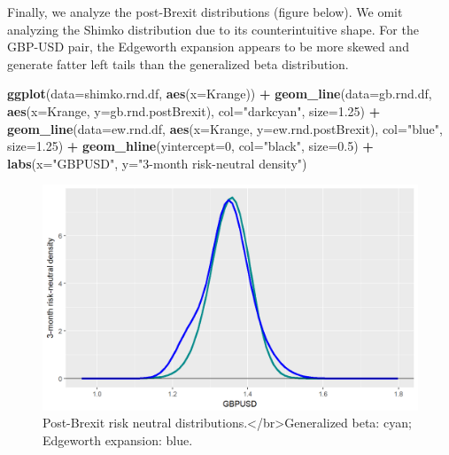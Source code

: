 \documentclass[]{book}
\newenvironment{Shaded}{\begin{snugshade}}{\end{snugshade}}
\newcommand{\KeywordTok}[1]{\textcolor[rgb]{0.13,0.29,0.53}{\textbf{#1}}}
\newcommand{\DataTypeTok}[1]{\textcolor[rgb]{0.13,0.29,0.53}{#1}}
\newcommand{\DecValTok}[1]{\textcolor[rgb]{0.00,0.00,0.81}{#1}}
\newcommand{\FloatTok}[1]{\textcolor[rgb]{0.00,0.00,0.81}{#1}}
\newcommand{\StringTok}[1]{\textcolor[rgb]{0.31,0.60,0.02}{#1}}
\newcommand{\OperatorTok}[1]{\textcolor[rgb]{0.81,0.36,0.00}{\textbf{#1}}}
\newcommand{\NormalTok}[1]{#1}
\theoremstyle{definition}
\theoremstyle{definition}
\theoremstyle{definition}
\theoremstyle{remark}
\begin{document}
Finally, we analyze the post-Brexit distributions (figure below). We
omit analyzing the Shimko distribution due to its counterintuitive
shape. For the GBP-USD pair, the Edgeworth expansion appears to be more
skewed and generate fatter left tails than the generalized beta
distribution.

\begin{Shaded}
\begin{Highlighting}[]
\KeywordTok{ggplot}\NormalTok{(}\DataTypeTok{data=}\NormalTok{shimko.rnd.df, }\KeywordTok{aes}\NormalTok{(}\DataTypeTok{x=}\NormalTok{Krange)) }\OperatorTok{+}\StringTok{ }
\StringTok{  }\KeywordTok{geom_line}\NormalTok{(}\DataTypeTok{data=}\NormalTok{gb.rnd.df, }\KeywordTok{aes}\NormalTok{(}\DataTypeTok{x=}\NormalTok{Krange, }\DataTypeTok{y=}\NormalTok{gb.rnd.postBrexit), }\DataTypeTok{col=}\StringTok{"darkcyan"}\NormalTok{, }\DataTypeTok{size=}\FloatTok{1.25}\NormalTok{) }\OperatorTok{+}
\StringTok{  }\KeywordTok{geom_line}\NormalTok{(}\DataTypeTok{data=}\NormalTok{ew.rnd.df, }\KeywordTok{aes}\NormalTok{(}\DataTypeTok{x=}\NormalTok{Krange, }\DataTypeTok{y=}\NormalTok{ew.rnd.postBrexit), }\DataTypeTok{col=}\StringTok{"blue"}\NormalTok{, }\DataTypeTok{size=}\FloatTok{1.25}\NormalTok{) }\OperatorTok{+}
\StringTok{  }\KeywordTok{geom_hline}\NormalTok{(}\DataTypeTok{yintercept=}\DecValTok{0}\NormalTok{, }\DataTypeTok{col=}\StringTok{"black"}\NormalTok{, }\DataTypeTok{size=}\FloatTok{0.5}\NormalTok{) }\OperatorTok{+}
\StringTok{  }\KeywordTok{labs}\NormalTok{(}\DataTypeTok{x=}\StringTok{"GBPUSD"}\NormalTok{, }\DataTypeTok{y=}\StringTok{"3-month risk-neutral density"}\NormalTok{)   }
\end{Highlighting}
\end{Shaded}

\begin{figure}
\includegraphics[width=1\linewidth]{images/unnamed-chunk-68-1} \caption{Post-Brexit risk neutral distributions.</br>Generalized beta: cyan; Edgeworth expansion: blue.}\label{fig:unnamed-chunk-68}
\end{figure}
\end{document}
